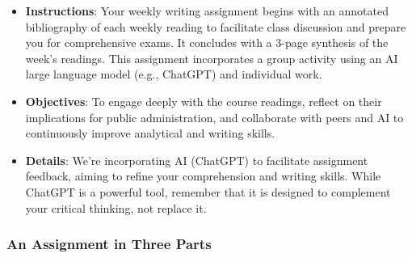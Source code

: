 \documentclass[12pt, letterpaper]{article}
\begin{document}
\begin{itemize}

    \item \textbf{Instructions}: Your weekly writing assignment begins with an annotated bibliography of each weekly reading to facilitate class discussion and prepare you for comprehensive exams. It concludes with a 3-page synthesis of the week’s readings. This assignment incorporates a group activity using an AI large language model (e.g., ChatGPT) and individual work.

    \item \textbf{Objectives}: To engage deeply with the course readings, reflect on their implications for public administration, and collaborate with peers and AI to continuously improve analytical and writing skills.

    \item \textbf{Details}: We’re incorporating AI (ChatGPT) to facilitate assignment feedback, aiming to refine your comprehension and writing skills. While ChatGPT is a powerful tool, remember that it is designed to complement your critical thinking, not replace it.
    
\end{itemize}

\subsubsection{An Assignment in Three Parts}
\end{document}
